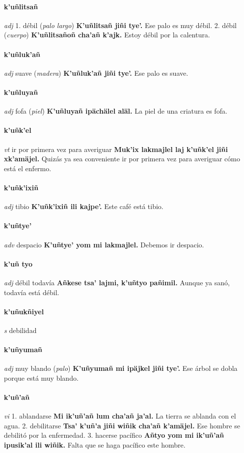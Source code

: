 \documentclass{scrbook}
\newcommand{\entry}[1]{\paragraph{#1}}
\newcommand{\onedefinition}[1]{#1.}
\newcommand{\partofspeech}[1]{\textit{#1}}
\newcommand{\spanishtranslation}[1]{#1}
\newcommand{\clarification}[1]{(\textit{#1})}
\newcommand{\cholexample}[1]{\textbf{#1}}
\newcommand{\exampletranslation}[1]{#1}
\begin{document}
\begin{multicols}{2}
\entry{k'uñlitsañ}
\partofspeech{adj}
\onedefinition{1}
\spanishtranslation{débil}
\clarification{palo largo}
\cholexample{K'uñlitsañ jiñi tye'.}
\exampletranslation{Ese palo es muy débil.}
\onedefinition{2}
\spanishtranslation{débil}
\clarification{cuerpo}
\cholexample{K'uñlitsañoñ cha'añ k'ajk.}
\exampletranslation{Estoy débil por la calentura.}

\entry{k'uñluk'añ}
\partofspeech{adj}
\spanishtranslation{suave}
\clarification{madera}
\cholexample{K'uñluk'añ jiñi tye'.}
\exampletranslation{Ese palo es suave.}

\entry{k'uñluyañ}
\partofspeech{adj}
\spanishtranslation{fofa}
\clarification{piel}
\cholexample{K'uñluyañ ipächälel aläl.}
\exampletranslation{La piel de una criatura es fofa.}

\entry{k'uñk'el}
\partofspeech{vt}
\spanishtranslation{ir por primera vez para averiguar}
\cholexample{Muk'ix lakmajlel laj k'uñk'el jiñi xk'amäjel.}
\exampletranslation{Quizás ya sea conveniente ir por primera vez para averiguar cómo está el enfermo.}

\entry{k'uñk'ixiñ}
\partofspeech{adj}
\spanishtranslation{tibio}
\cholexample{K'uñk'ixiñ ili kajpe'.}
\exampletranslation{Este café está tibio.}

\entry{k'uñtye'}
\partofspeech{adv}
\spanishtranslation{despacio}
\cholexample{K'uñtye' yom mi lakmajlel.}
\exampletranslation{Debemos ir despacio.}

\entry{k'uñ tyo}
\partofspeech{adj}
\spanishtranslation{débil todavía}
\cholexample{Añkese tsa' lajmi, k'uñtyo pañimil.}
\exampletranslation{Aunque ya sanó, todavía está débil.}

\entry{k'uñukñiyel}
\partofspeech{s}
\spanishtranslation{debilidad}

\entry{k'uñyumañ}
\partofspeech{adj}
\spanishtranslation{muy blando}
\clarification{palo}
\cholexample{K'uñyumañ mi ipäjkel jiñi tye'.}
\exampletranslation{Ese árbol se dobla porque está muy blando.}

\entry{k'uñ'añ}
\partofspeech{vi}
\onedefinition{1}
\spanishtranslation{ablandarse}
\cholexample{Mi ik'uñ'añ lum cha'añ ja'al.}
\exampletranslation{La tierra se ablanda con el agua.}
\onedefinition{2}
\spanishtranslation{debilitarse}
\cholexample{Tsa' k'uñ'a jiñi wiñik cha'añ k'amäjel.}
\exampletranslation{Ese hombre se debilitó por la enfermedad.}
\onedefinition{3}
\spanishtranslation{hacerse pacífico}
\cholexample{Añtyo yom mi ik'uñ'añ ipusik'al ili wiñik.}
\exampletranslation{Falta que se haga pacífico este hombre.}


\end{multicols}
\end{document}

